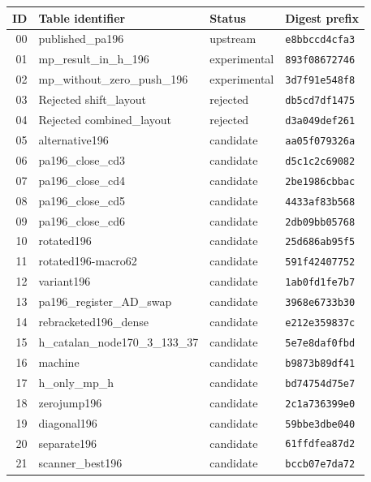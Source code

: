 \small
\begin{longtable}{@{}r p{}l l@{}}
\toprule
ID & Table identifier & Status & Digest prefix \\
\midrule\endhead
00 & published\_pa196 & upstream & \texttt{e8bbccd4cfa3} \\
01 & mp\_result\_in\_h\_196 & experimental & \texttt{893f08672746} \\
02 & mp\_without\_zero\_push\_196 & experimental & \texttt{3d7f91e548f8} \\
03 & Rejected shift\_layout & rejected & \texttt{db5cd7df1475} \\
04 & Rejected combined\_layout & rejected & \texttt{d3a049def261} \\
05 & alternative196 & candidate & \texttt{aa05f079326a} \\
06 & pa196\_close\_cd3 & candidate & \texttt{d5c1c2c69082} \\
07 & pa196\_close\_cd4 & candidate & \texttt{2be1986cbbac} \\
08 & pa196\_close\_cd5 & candidate & \texttt{4433af83b568} \\
09 & pa196\_close\_cd6 & candidate & \texttt{2db09bb05768} \\
10 & rotated196 & candidate & \texttt{25d686ab95f5} \\
11 & rotated196-macro62 & candidate & \texttt{591f42407752} \\
12 & variant196 & candidate & \texttt{1ab0fd1fe7b7} \\
13 & pa196\_register\_AD\_swap & candidate & \texttt{3968e6733b30} \\
14 & rebracketed196\_dense & candidate & \texttt{e212e359837c} \\
15 & h\_catalan\_node170\_3\_133\_37 & candidate & \texttt{5e7e8daf0fbd} \\
16 & machine & candidate & \texttt{b9873b89df41} \\
17 & h\_only\_mp\_h & candidate & \texttt{bd74754d75e7} \\
18 & zerojump196 & candidate & \texttt{2c1a736399e0} \\
19 & diagonal196 & candidate & \texttt{59bbe3dbe040} \\
20 & separate196 & candidate & \texttt{61ffdfea87d2} \\
21 & scanner\_best196 & candidate & \texttt{bccb07e7da72} \\
\bottomrule
\end{longtable}
\normalsize
